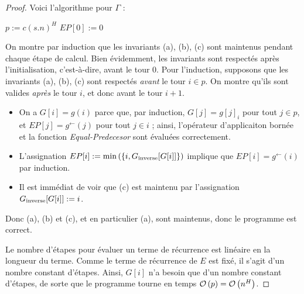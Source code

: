 \documentclass{article}
\begin{document}
\begin{proof}
{			Voici l'algorithme pour $\Gamma$ :
			
			\begin{algorithm}[H]
				
				
				$p := c(s.n)^H$ \;
				$EP[0] := 0$ \;
				
				
					
			\end{algorithm}
			
			On montre par induction que les invariants (a), (b), (c) sont maintenus pendant chaque étape de calcul. Bien évidemment, les invariants sont respectés après l'initialisation, c'est-à-dire, avant le tour $0$. 
			Pour l'induction, supposons que les invariants (a), (b), (c) sont respectés \emph{avant} le tour $i \in p$. On montre qu'ils sont valides \emph{après} le tour $i$, et donc avant le tour $i+1$. 
			
			\begin{itemize}
				\item 	On a $G[i] = g(i)$ parce que, par induction, $G[j] = g[j]_i$ pour tout $j \in p$, et $EP[j] = g^{\leftarrow}(j)$ pour tout $j \in i$ ; ainsi, l'opérateur d'applicaiton bornée et la fonction \emph{Equal-Predecesor} sont évaluées correctement.
				
				\item 	L'assignation $EP[i] := \min\left( \left\lbrace i, G_{\text{inverse}}[G[i]] \right\rbrace \right)$ implique que $EP[i] = g^{\leftarrow}(i)$ par induction.
				
				\item 	Il est immédiat de voir que (c) est maintenu par l'assignation $G_{\text{inverse}}[G[i]] := i$. 
			\end{itemize}
			
			Donc (a), (b) et (c), et en particulier (a), sont maintenus, donc le programme est correct.
			
			Le nombre d'étapes pour évaluer un terme de récurrence est linéaire en la longueur du terme. Comme le terme de récurrence de $E$ est fixé, il s'agit d'un nombre constant d'étapes. Ainsi, $G[i]$ n'a besoin que d'un nombre constant d'étapes, de sorte que le programme tourne en temps $\mathcal{O}\left( p \right) = \mathcal{O}\left( n^H \right)$.
			
}
			
		\end{proof}
		
\end{document}
